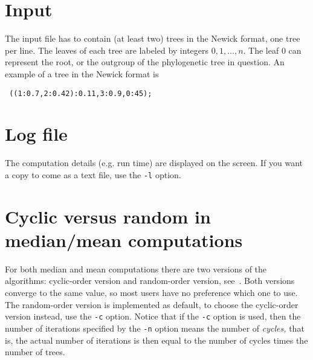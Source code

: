 \documentclass[a4paper,12pt]{amsart}
\begin{document}

\section{Input} \label{sec:input}
The input file has to contain (at least two) trees in the Newick format, one tree per line. The leaves of each tree are labeled by integers $0,1,\dots,n.$ The leaf $0$ can represent the root, or the outgroup of the phylogenetic tree in question. An example of a tree in the Newick format is
\begin{verbatim}
 ((1:0.7,2:0.42):0.11,3:0.9,0:45);
\end{verbatim}



\section{Log file}
The computation details (e.g. run time) are displayed on the screen. If you want a copy to come as a text file, use the \texttt{-l} option.


\section{Cyclic versus random in median/mean computations} \label{sec:cycvran}
For both median and mean computations there are two versions of the algorithms: cyclic-order version and random-order version, see~\cite{mm}. Both versions converge to the same value, so most users have no preference which one to use. The random-order version is implemented as default, to choose the cyclic-order version instead, use the \texttt{-c} option. Notice that if the \texttt{-c} option is used, then the number of iterations specified by the \texttt{-n} option means the number of \emph{cycles,} that is, the actual number of iterations is then equal to the number of cycles times the number of trees.
\end{document}
